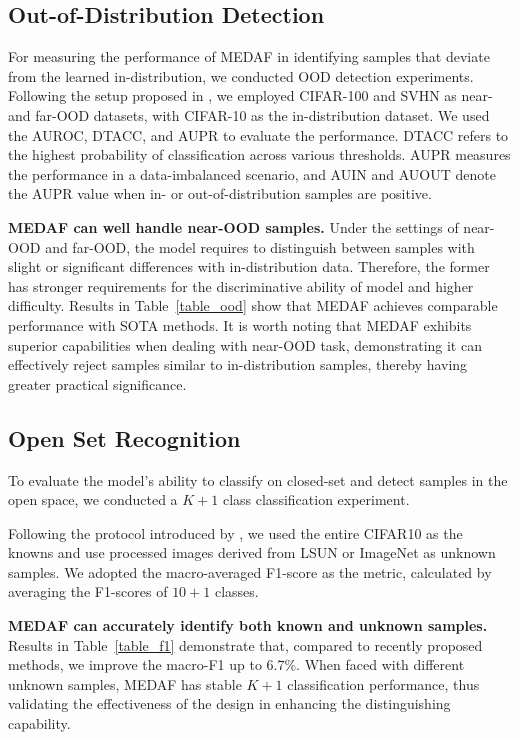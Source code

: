 \documentclass[letterpaper]{article} %
\begin{document}
\subsection{Out-of-Distribution Detection}
For measuring the performance of MEDAF in identifying samples that deviate from the learned in-distribution, we conducted OOD detection experiments. Following the setup proposed in \cite{chen2020learning}, we employed CIFAR-100 and SVHN as near- and far-OOD datasets, with CIFAR-10 as the in-distribution dataset. We used the AUROC, DTACC, and AUPR to evaluate the performance. DTACC refers to the highest probability of classification across various thresholds. AUPR measures the performance in a data-imbalanced scenario, and AUIN and AUOUT denote the AUPR value when in- or out-of-distribution samples are positive.

\textbf{MEDAF can well handle near-OOD samples.} Under the settings of near-OOD and far-OOD, the model requires to distinguish between samples with slight or significant differences with in-distribution data. Therefore, the former has stronger requirements for the discriminative ability of model and higher difficulty. Results in Table~\ref{table_ood} show that MEDAF achieves comparable performance with SOTA methods. It is worth noting that MEDAF exhibits superior capabilities when dealing with near-OOD task, demonstrating it can effectively reject samples similar to in-distribution samples, thereby having greater practical significance.

\subsection{Open Set Recognition}
To evaluate the model's ability to classify on closed-set and detect samples in the open space, we conducted a $K+1$ class classification experiment.

Following the protocol introduced by \cite{yoshihashi2019classification}, we used the entire CIFAR10 as the knowns and use processed images derived from LSUN \cite{yu2015lsun} or ImageNet \cite{deng2009imagenet} as unknown samples. We adopted the macro-averaged F1-score as the metric, calculated by averaging the F1-scores of $10+1$ classes.

\textbf{MEDAF can accurately identify both known and unknown samples.} Results in Table~\ref{table_f1} demonstrate that, compared to recently proposed methods, we improve the macro-F1 up to 6.7\%. When faced with different unknown samples, MEDAF has stable $K+1$ classification performance, thus validating the effectiveness of the design in enhancing the distinguishing capability.
\end{document}
